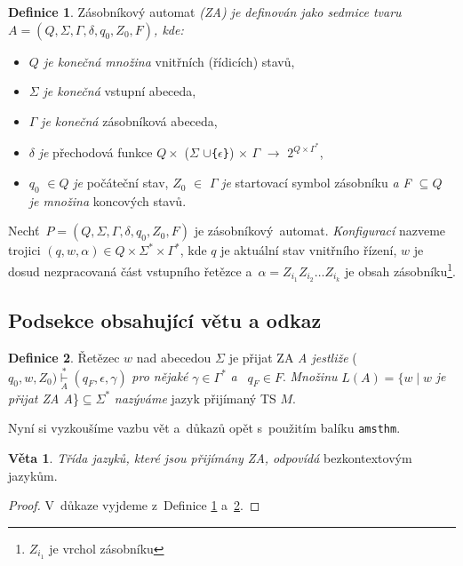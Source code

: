 \documentclass[a4paper, 11pt, twocolumn]{article}
\theoremstyle{definition}
\newtheorem{definice}{Definice}
\theoremstyle{definition}
\newtheorem{veta}{Věta}
\begin{document}
\begin{definice} \label{definice1}
Zásobníkový automat \emph{(ZA) je definován jako sedmice tvaru $A = (Q,\Sigma,\Gamma,\delta,q_0,Z_0,F)$, kde:} 

\begin{itemize}
\item \emph{$Q$ je konečná množina} vnitřních (řídicích) stavů,
\item $\Sigma$ \emph{je konečná} vstupní abeceda,
\item $\Gamma$ \emph{je konečná} zásobníková abeceda,
\item $\delta$ \emph{je} přechodová funkce $Q \times$ ($\Sigma$ $\cup$\verb|{|$\epsilon$\verb|}|) $\times$ $\Gamma$ $\rightarrow$ $2^{Q \times \Gamma ^*}$,
\item $q_0$ $\in Q$ \emph{je} počáteční stav, $Z_0$ $\in$ $\Gamma$ \emph{je} startovací symbol zásobníku \emph{a F $\subseteq Q$ je množina }koncových stavů.
\end{itemize}

\mbox{Nechť $P = (Q,\Sigma,\Gamma,\delta,q_0,Z_0,F)$} je zásobníkový~auto\-mat. \emph{Konfigurací} nazveme trojici \mbox{\small{$(q, w, \alpha) \in Q \times \Sigma^* \times \Gamma^*$}}, kde $q$ je aktuální stav vnitřního řízení, $w$ je dosud nezpra\-covaná část vstupního řetězce a~$\alpha = Z_{i_1}Z_{i_2}\dots Z_{i_k}$ je obsah zásobníku\footnote{$Z_{i_1}$ je vrchol zásobníku}.
\end{definice}

\subsection{Podsekce obsahující větu a odkaz}
\begin{definice} \label{definice2}
Řetězec $w$ nad abecedou $\Sigma$ je přijat ZA \emph{A jestliže} ($q_0,w,Z_0)\underset{A}{\overset{*}{\vdash}}(q_F,\epsilon,\gamma)$ \emph{pro nějaké }$\gamma\in\Gamma^*$\emph{ a~} $q_F\in F$. \emph{Množinu }$L(A) = \{w\mid w$\emph{ je přijat ZA A}\}$\subseteq\Sigma^*$\emph{ nazýváme} jazyk přijímaný TS $M$.

\end{definice}
Nyní si vyzkoušíme vazbu vět a~důkazů opět s~použitím balíku \verb|amsthm|.

\begin{veta} \label{veta1}
\emph{Třída jazyků, které jsou přijímány ZA, odpovídá} bezkontextovým jazykům.
\end{veta}

\begin{proof}
V~důkaze vyjdeme z~Definice \ref{definice1} a~\ref{definice2}.
\end{proof}
\end{document}
